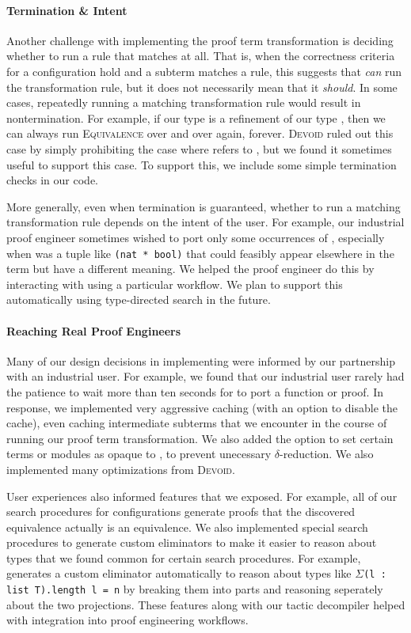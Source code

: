 \paragraph{Termination \& Intent}

Another challenge with implementing the proof term transformation is deciding whether to run a rule that matches at all.
That is, when the correctness criteria for a configuration hold and a subterm matches a rule, this suggests that \toolname \textit{can}
run the transformation rule, but it does not necessarily mean that it \textit{should}.
In some cases, repeatedly running a matching transformation rule would result in nontermination.
For example, if our type \B is a refinement of our type \A, then we can always run \textsc{Equivalence}
over and over again, forever.
\textsc{Devoid} ruled out this case by simply prohibiting the case where \B refers to \A, but we found it sometimes
useful to support this case.
To support this, we include some simple termination checks in our code.

More generally, even when termination is guaranteed, whether to run a matching transformation rule
depends on the intent of the user.
For example, our industrial proof engineer sometimes wished to port only some occurrences of \A,
especially when \A was a tuple like \lstinline{(nat * bool)} that could feasibly appear elsewhere in the term
but have a different meaning.
We helped the proof engineer do this by interacting with \toolname using a particular workflow.
We plan to support this automatically using type-directed search in the future.

\paragraph{Reaching Real Proof Engineers}
Many of our design decisions in implementing \toolname were informed by our partnership with
an industrial user.
For example, we found that our industrial user rarely had the patience to wait more than ten seconds
for \toolname to port a function or proof.
In response, we implemented very aggressive caching (with an option to disable the cache), even caching intermediate subterms that
we encounter in the course of running our proof term transformation.
We also added the option to set certain terms or modules as opaque to \toolname, to prevent
unecessary $\delta$-reduction.
We also implemented many optimizations from \textsc{Devoid}.

User experiences also informed features that we exposed.
For example, all of our search procedures for configurations generate proofs that the discovered
equivalence actually is an equivalence.
We also implemented special search procedures to generate custom eliminators to make it easier to reason about
types that we found common for certain search procedures.
For example, \toolname generates a custom eliminator automatically to reason about types like $\Sigma$\lstinline{(l : list T).length l = n}
by breaking them into parts and reasoning seperately about the two projections.
These features along with our tactic decompiler helped with integration into proof engineering workflows.

